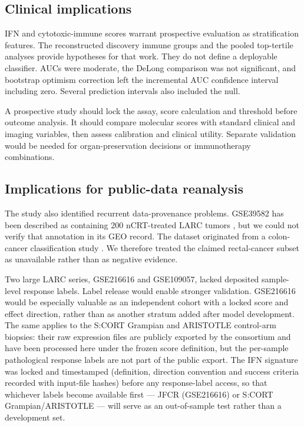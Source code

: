 \documentclass[11pt,a4paper]{article}
\begin{document}
\subsection{Clinical implications}

IFN and cytotoxic-immune scores warrant prospective evaluation as stratification features. The reconstructed discovery immune groups and the pooled top-tertile analyses provide hypotheses for that work. They do not define a deployable classifier. AUCs were moderate, the DeLong comparison was not significant, and bootstrap optimism correction left the incremental AUC confidence interval including zero. Several prediction intervals also included the null.

A prospective study should lock the assay, score calculation and threshold before outcome analysis. It should compare molecular scores with standard clinical and imaging variables, then assess calibration and clinical utility. Separate validation would be needed for organ-preservation decisions or immunotherapy combinations.

\subsection{Implications for public-data reanalysis}

The study also identified recurrent data-provenance problems. GSE39582 has been described as containing 200 nCRT-treated LARC tumors \cite{Xue}, but we could not verify that annotation in its GEO record. The dataset originated from a colon-cancer classification study \cite{Marisa}. We therefore treated the claimed rectal-cancer subset as unavailable rather than as negative evidence.

Two large LARC series, GSE216616 and GSE109057, lacked deposited sample-level response labels. Label release would enable stronger validation. GSE216616 would be especially valuable as an independent cohort with a locked score and effect direction, rather than as another stratum added after model development. The same applies to the S:CORT Grampian and ARISTOTLE control-arm biopsies: their raw expression files are publicly exported by the consortium and have been processed here under the frozen score definition, but the per-sample pathological response labels are not part of the public export. The IFN signature was locked and timestamped (definition, direction convention and success criteria recorded with input-file hashes) before any response-label access, so that whichever labels become available first --- JFCR (GSE216616) or S:CORT Grampian/ARISTOTLE --- will serve as an out-of-sample test rather than a development set.
\end{document}

